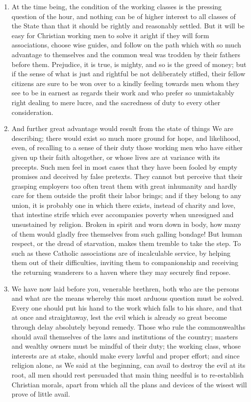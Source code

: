 \documentclass{book}
\begin{document}
\begin{enumerate}
	\item At the time being, the condition of the working classes is the pressing question of the hour, and nothing can be of higher interest to all classes of the State than that it should be rightly and reasonably settled. But it will be easy for Christian working men to solve it aright if they will form associations, choose wise guides, and follow on the path which with so much advantage to themselves and the common weal was trodden by their fathers before them. Prejudice, it is true, is mighty, and so is the greed of money; but if the sense of what is just and rightful be not deliberately stifled, their fellow citizens are sure to be won over to a kindly feeling towards men whom they see to be in earnest as regards their work and who prefer so unmistakably right dealing to mere lucre, and the sacredness of duty to every other consideration.


	\item And further great advantage would result from the state of things We are describing; there would exist so much more ground for hope, and likelihood, even, of recalling to a sense of their duty those working men who have either given up their faith altogether, or whose lives are at variance with its precepts. Such men feel in most cases that they have been fooled by empty promises and deceived by false pretexts. They cannot but perceive that their grasping employers too often treat them with great inhumanity and hardly care for them outside the profit their labor brings; and if they belong to any union, it is probably one in which there exists, instead of charity and love, that intestine strife which ever accompanies poverty when unresigned and unsustained by religion. Broken in spirit and worn down in body, how many of them would gladly free themselves from such galling bondage! But human respect, or the dread of starvation, makes them tremble to take the step. To such as these Catholic associations are of incalculable service, by helping them out of their difficulties, inviting them to companionship and receiving the returning wanderers to a haven where they may securely find repose.


	\item We have now laid before you, venerable brethren, both who are the persons and what are the means whereby this most arduous question must be solved. Every one should put his hand to the work which falls to his share, and that at once and straightaway, lest the evil which is already so great become through delay absolutely beyond remedy. Those who rule the commonwealths should avail themselves of the laws and institutions of the country; masters and wealthy owners must be mindful of their duty; the working class, whose interests are at stake, should make every lawful and proper effort; and since religion alone, as We said at the beginning, can avail to destroy the evil at its root, all men should rest persuaded that main thing needful is to re-establish Christian morals, apart from which all the plans and devices of the wisest will prove of little avail.



\end{enumerate}
\end{document}
